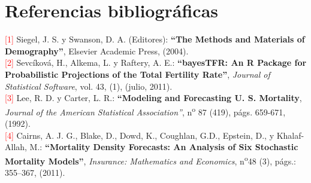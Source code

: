 




\newpage

\section*{Referencias bibliogr\'aficas}
%

\noindent \textcolor{red}{[1]} Siegel, J. S. y Swanson, D. A. (Editores): \textbf{``The Methods and Materials of Demography''}, Elsevier Academic Press, (2004).\\

\noindent \textcolor{red}{[2]} Sevcíková, H., Alkema, L. y Raftery, A. E.: \textbf{``bayesTFR: An R Package for Probabilistic Projections of the Total Fertility Rate''}, \textit{Journal of Statistical Software}, vol. 43, (1), (julio, 2011).\\ 

\noindent \textcolor{red}{[3]} Lee, R. D. y Carter, L. R.: \textbf{``Modeling and Forecasting U. S. Mortality}, \textit{Journal of the American Statistical Association''}, n\textsuperscript{o} 87 (419), p\'ags. 659-671, (1992).\\

\noindent \textcolor{red}{[4]} Cairns, A. J. G., Blake, D., Dowd, K., Coughlan, G.D., Epstein, D., y Khalaf-Allah, M.: \textbf{``Mortality Density Forecasts: An Analysis of Six Stochastic Mortality Models''}, \textit{Insurance: Mathematics and Economics}, n\textsuperscript{o}48 (3), p\'ags.: 355–367, (2011).\\

